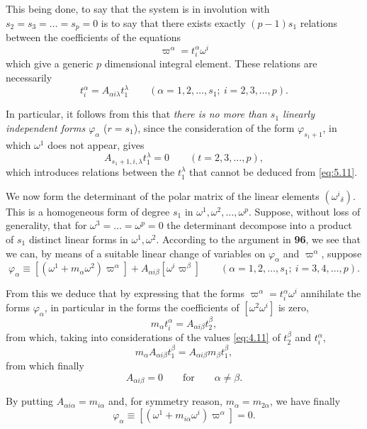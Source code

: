 This being done, to say that the system is in involution with $s_{2}=s_{3}=\dots=s_{p}=0$ is to say that there exists exactly $(p-1)s_{1}$ relations between the coefficients of the equations
\begin{equation}
  \label{eq:5.10}
  \varpi^{\alpha}=t_{i}^{\alpha}\omega^{i}
\end{equation}
which give a generic $p$ dimensional integral element. These relations are necessarily
\begin{equation}
  \label{eq:5.11}
  t_{i}^{\alpha}=A_{\alpha i \lambda}t_{1}^{\lambda}\qquad(\alpha=1,2,\dots,s_{1};\ i=2,3,\dots,p).
\end{equation}

In particular, it follows from this that \emph{there is no more than $s_{1}$ linearly independent forms $\varphi_{\alpha}$} ($r=s_{1}$), since the consideration of the form $\varphi_{s_{1}+1}$, in which $\omega^{1}$ does not appear, gives
\[
A_{s_{1}+1,i,\lambda}t_{1}^{\lambda}=0\qquad(t=2,3,\dots,p),
\]
which introduces relations between the $t_{1}^{\lambda}$ that cannot be deduced from \eqref{eq:5.11}.

We now form the determinant of the polar matrix of the linear elements $(\omega^{i}{}_{\delta})$. This is a homogeneous form of degree $s_{1}$ in $\omega^{1},\omega^{2},\dots,\omega^{p}$. Suppose, without loss of generality, that for $\omega^{3}=\dots=\omega^{p}=0$ the determinant decompose into a product of $s_{1}$ distinct linear forms in $\omega^{1},\omega^{2}$. According to the argument in \textsection\textbf{96}, we see that we can, by means of a suitable linear change of variables on $\varphi_{\alpha}$ and $\varpi^{\alpha}$, suppose
\[
\varphi_{\alpha}\equiv[(\omega^{1}+m_{\alpha}\omega^{2})\varpi^{\alpha}]+A_{\alpha i \beta}[\omega^{i}\varpi^{\beta}]\qquad(\alpha=1,2,\dots,s_{1};\ i=3,4,\dots,p).
\]

From this we deduce that by expressing that the forms $\varpi^{\alpha}=t_{i}^{\alpha}\omega^{i}$ annihilate the forms $\varphi_{\alpha}$, in particular in the forms the coefficients of $[\omega^{2}\omega^{i}]$ is zero,
\[
m_{\alpha}t_{i}^{\alpha}=A_{\alpha i\beta}t_{2}^{\beta},
\]
from which, taking into considerations of the values \eqref{eq:4.11} of $t_{2}^{\beta}$ and $t_{i}^{\alpha}$,
\[
m_{\alpha}A_{\alpha i\beta}t_{1}^{\beta}=A_{\alpha i \beta}m_{\beta}t_{1}^{\beta},
\]
from which finally
\[
A_{\alpha i \beta}=0\qquad\text{for}\qquad \alpha\neq \beta.
\]

By putting $A_{\alpha i\alpha}=m_{i\alpha}$ and, for symmetry reason, $m_{\alpha}=m_{2\alpha}$, we have finally
\begin{equation}
  \label{eq:5.12}
  \varphi_{\alpha}\equiv[(\omega^{1}+m_{i\alpha}\omega^{i})\varpi^{\alpha}]=0.
\end{equation}

